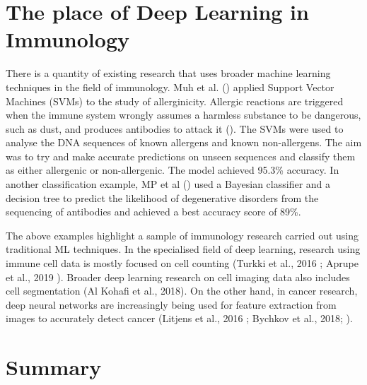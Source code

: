 \section{The place of Deep Learning in Immunology}

There is a quantity of existing research that uses broader machine learning techniques in the field of immunology. Muh et al. (\cite{https://www.ncbi.nlm.nih.gov/pubmed/19516900/}) applied Support Vector Machines (SVMs) to the study of allerginicity. Allergic reactions are triggered when the immune system wrongly assumes a harmless substance to be dangerous, such as dust, and produces antibodies to attack it  (\cite{https://www.immunology.org/policy-and-public-affairs/briefings-and-position-statements/allergy}). The SVMs were used to analyse the DNA sequences of known allergens and known non-allergens. The aim was to try and make accurate predictions on unseen sequences and classify them as either allergenic or non-allergenic. The model achieved 95.3\% accuracy.  In another classification example, MP et al (\cite{https://www.ncbi.nlm.nih.gov/pubmed/20144194/}) used a Bayesian classifier and a decision tree to predict the likelihood of degenerative disorders from the sequencing of antibodies and achieved a best accuracy score of 89\%.

The above examples highlight a sample of immunology research carried out using traditional ML techniques. In the specialised field of deep learning, research using immune cell data is mostly focused on cell counting (Turkki et al., 2016 \cite{https://www.ncbi.nlm.nih.gov/pmc/articles/PMC5027738/}; Aprupe et al., 2019 \cite{https://www.ncbi.nlm.nih.gov/pmc/articles/PMC6462181/}). Broader deep learning research on cell imaging data also includes cell segmentation (Al Kohafi et al., 2018). On the other hand, in cancer research, deep neural networks are increasingly being used for feature extraction from images to accurately detect cancer (Litjens et al., 2016 \cite{https://www.ncbi.nlm.nih.gov/pmc/articles/PMC4876324/}; Bychkov et al., 2018; \cite{https://www.ncbi.nlm.nih.gov/pmc/articles/PMC5821847/}).

\section{Summary}

